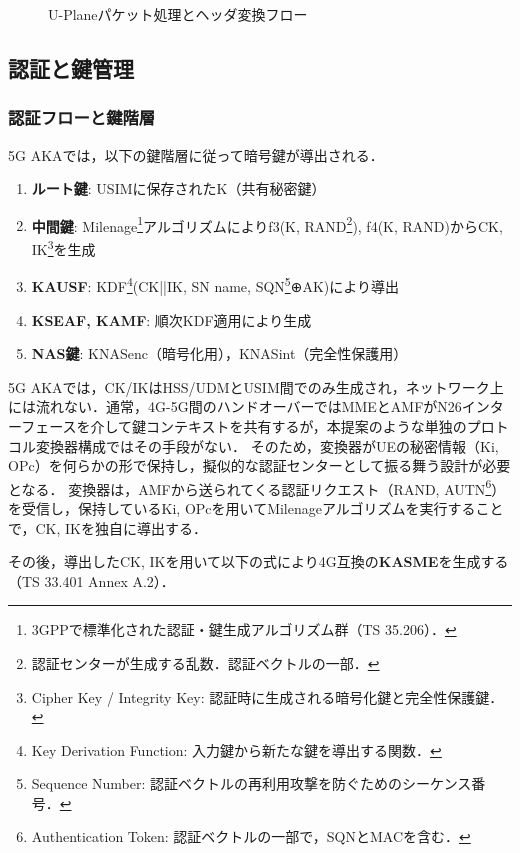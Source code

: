 \begin{figure}[htbp]
\begin{tikzpicture}[scale=0.85, transform shape, every node/.style={font=\small}]
  \end{tikzpicture}
  \caption{U-Planeパケット処理とヘッダ変換フロー}
  \label{fig:uplane_processing}
\end{figure}

\subsection{認証と鍵管理}
\label{subsec:auth_key_management}

\subsubsection{認証フローと鍵階層}
5G AKAでは，以下の鍵階層に従って暗号鍵が導出される．

\begin{enumerate}
\item \textbf{ルート鍵}: USIMに保存されたK（共有秘密鍵）
\item \textbf{中間鍵}: Milenage\footnote{3GPPで標準化された認証・鍵生成アルゴリズム群（TS 35.206）．}アルゴリズムによりf3(K, RAND\footnote{認証センターが生成する乱数．認証ベクトルの一部．}), f4(K, RAND)からCK, IK\footnote{Cipher Key / Integrity Key: 認証時に生成される暗号化鍵と完全性保護鍵．}を生成
\item \textbf{KAUSF}: KDF\footnote{Key Derivation Function: 入力鍵から新たな鍵を導出する関数．}(CK||IK, SN name, SQN\footnote{Sequence Number: 認証ベクトルの再利用攻撃を防ぐためのシーケンス番号．}⊕AK)により導出
\item \textbf{KSEAF, KAMF}: 順次KDF適用により生成
\item \textbf{NAS鍵}: KNASenc（暗号化用），KNASint（完全性保護用）
\end{enumerate}

5G AKAでは，CK/IKはHSS/UDMとUSIM間でのみ生成され，ネットワーク上には流れない．通常，4G-5G間のハンドオーバーではMMEとAMFがN26インターフェースを介して鍵コンテキストを共有するが，本提案のような単独のプロトコル変換器構成ではその手段がない．
そのため，変換器がUEの秘密情報（Ki, OPc）を何らかの形で保持し，擬似的な認証センターとして振る舞う設計が必要となる．
変換器は，AMFから送られてくる認証リクエスト（RAND, AUTN\footnote{Authentication Token: 認証ベクトルの一部で，SQNとMACを含む．}）を受信し，保持しているKi, OPcを用いてMilenageアルゴリズムを実行することで，CK, IKを独自に導出する．

その後，導出したCK, IKを用いて以下の式により4G互換の\textbf{KASME}を生成する（TS 33.401\cite{3GPP_TS33401} Annex A.2）．

